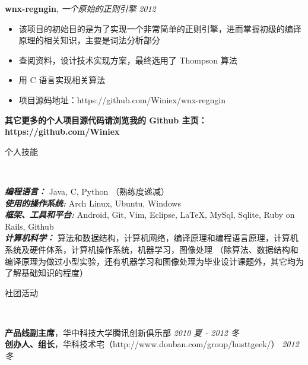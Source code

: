 \documentclass[9pt]{ctexart}
\newenvironment{changemargin}[2]{%
    \begin{list}{}{%
            \setlength{\topsep}{0pt}%
            \setlength{\leftmargin}{#1}%
            \setlength{\rightmargin}{#2}%
            \setlength{\listparindent}{\parindent}%
        \setlength{\itemindent}{\parindent}%
            \setlength{\parsep}{\parskip}%
        }%
  \item[]}{\end{list}
      }
\newcommand{\lineover}{
          \begin{changemargin}{-0.05in}{-0.05in}
              \vspace*{-8pt}
              \hrulefill \\
              \vspace*{-2pt}
          \end{changemargin}
      }
\newcommand{\header}[1]{
          \begin{changemargin}{-0.5in}{-0.5in}
              \scshape{#1}\\
              \lineover
          \end{changemargin}
      }
\newenvironment{body} {
          \vspace*{-16pt}
          \begin{changemargin}{-0.25in}{-0.5in}
          }	
      {\end{changemargin}
      }
\begin{document}
\begin{body}
          \vspace*{-4pt}
          \textbf {wnx-regngin}, \emph{一个原始的正则引擎} \hfill \emph{2012}\\
      \begin{itemize} \itemsep -0pt
              \item 该项目的初始目的是为了实现一个非常简单的正则引擎，进而掌握初级的编译原理的相关知识，主要是词法分析部分
              \item 查阅资料，设计技术实现方案，最终选用了 Thompson 算法
              \item 用 C 语言实现相关算法
              \item 项目源码地址：https://github.com/Winiex/wnx-regngin
          \end{itemize}

          \vspace*{-4pt}
          \textbf {其它更多的个人项目源代码请浏览我的 Github 主页：https://github.com/Winiex}
      \end{body}

      \smallskip

      \header{个人技能}

      \begin{body}
          \vspace{14pt}
          \emph{\textbf{编程语言：}}{} Java, C, Python （熟练度递减）\\
          \medskip
          \emph{\textbf{使用的操作系统:}}{} Arch Linux, Ubuntu, Windows \\
          \medskip
          \emph{\textbf{框架、工具和平台:}}{} Android, Git, Vim, Eclipse, \LaTeX, MySql, Sqlite, Ruby on Rails, Github \\
          \medskip
          \emph{\textbf{计算机科学：}}{} 算法和数据结构，计算机网络，编译原理和编程语言原理，计算机系统及硬件体系，计算机操作系统，机器学习，图像处理 （除算法、数据结构和编译原理为做过小型实验，还有机器学习和图像处理为毕业设计课题外，其它均为了解基础知识的程度）

      \end{body}

      \smallskip


      \header{社团活动}

      \begin{body}
          \vspace{14pt}
          \textbf{产品线副主席}，华中科技大学腾讯创新俱乐部 \hfill {} \emph{2010 夏 - 2012 冬}\\
          \textbf{创办人、组长}，华科技术宅（http://www.douban.com/group/husttgeek/） \hfill {} \emph{2012 冬}\\
      \end{body}
\end{document}
